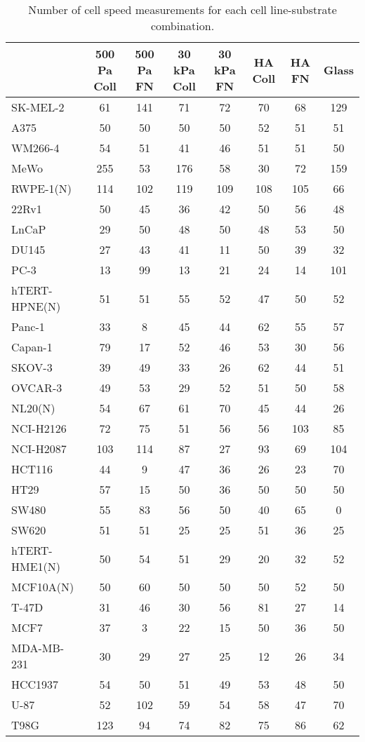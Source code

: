 \begin{table}[!h]
\centering
\caption{\label{tab:count-motility}Number of cell speed measurements for each cell line-substrate combination.}
\centering
\begin{tabular}[t]{lccccccc}
\toprule
  & 500 Pa Coll & 500 Pa FN & 30 kPa Coll & 30 kPa FN & HA Coll & HA FN & Glass\\
\midrule
SK-MEL-2 & 61 & 141 & 71 & 72 & 70 & 68 & 129\\
A375 & 50 & 50 & 50 & 50 & 52 & 51 & 51\\
WM266-4 & 54 & 51 & 41 & 46 & 51 & 51 & 50\\
MeWo & 255 & 53 & 176 & 58 & 30 & 72 & 159\\
RWPE-1(N) & 114 & 102 & 119 & 109 & 108 & 105 & 66\\
22Rv1 & 50 & 45 & 36 & 42 & 50 & 56 & 48\\
LnCaP & 29 & 50 & 48 & 50 & 48 & 53 & 50\\
DU145 & 27 & 43 & 41 & 11 & 50 & 39 & 32\\
PC-3 & 13 & 99 & 13 & 21 & 24 & 14 & 101\\
hTERT-HPNE(N) & 51 & 51 & 55 & 52 & 47 & 50 & 52\\
Panc-1 & 33 & 8 & 45 & 44 & 62 & 55 & 57\\
Capan-1 & 79 & 17 & 52 & 46 & 53 & 30 & 56\\
SKOV-3 & 39 & 49 & 33 & 26 & 62 & 44 & 51\\
OVCAR-3 & 49 & 53 & 29 & 52 & 51 & 50 & 58\\
NL20(N) & 54 & 67 & 61 & 70 & 45 & 44 & 26\\
NCI-H2126 & 72 & 75 & 51 & 56 & 56 & 103 & 85\\
NCI-H2087 & 103 & 114 & 87 & 27 & 93 & 69 & 104\\
HCT116 & 44 & 9 & 47 & 36 & 26 & 23 & 70\\
HT29 & 57 & 15 & 50 & 36 & 50 & 50 & 50\\
SW480 & 55 & 83 & 56 & 50 & 40 & 65 & 0\\
SW620 & 51 & 51 & 25 & 25 & 51 & 36 & 25\\
hTERT-HME1(N) & 50 & 54 & 51 & 29 & 20 & 32 & 52\\
MCF10A(N) & 50 & 60 & 50 & 50 & 50 & 52 & 50\\
T-47D & 31 & 46 & 30 & 56 & 81 & 27 & 14\\
MCF7 & 37 & 3 & 22 & 15 & 50 & 36 & 50\\
MDA-MB-231 & 30 & 29 & 27 & 25 & 12 & 26 & 34\\
HCC1937 & 54 & 50 & 51 & 49 & 53 & 48 & 50\\
U-87 & 52 & 102 & 59 & 54 & 58 & 47 & 70\\
T98G & 123 & 94 & 74 & 82 & 75 & 86 & 62\\
\bottomrule
\end{tabular}
\end{table}
